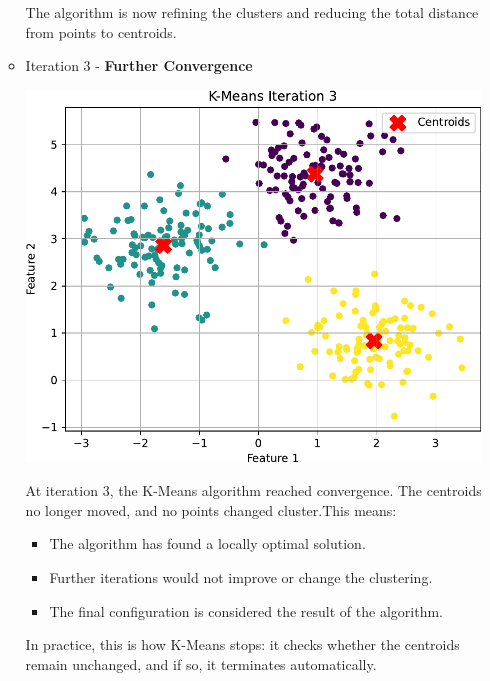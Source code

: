 \begin{itemize}
\begin{examplebox}
\begin{itemize}
            The algorithm is now refining the clusters and reducing the total distance from points to centroids.


            \item Iteration 3 - \textbf{Further Convergence}
            \begin{center}
                \includegraphics[width=.7\textwidth]{img/k-means/iter_3.pdf}
            \end{center}
            At iteration 3, the K-Means algorithm reached convergence. The centroids no longer moved, and no points changed cluster.This means:
            \begin{itemize}
                \item The algorithm has found a locally optimal solution.
                \item Further iterations would not improve or change the clustering.
                \item The final configuration is considered the result of the algorithm.
            \end{itemize}
            In practice, this is how K-Means stops: it checks whether the centroids remain unchanged, and if so, it terminates automatically.
        \end{itemize}
    \end{examplebox}
\end{itemize}

\highspace
{}